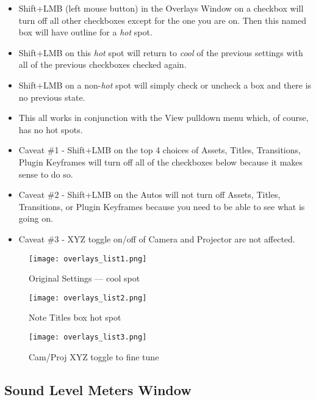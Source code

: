\begin{itemize}
    \item  Shift+LMB (left mouse button) in the Overlays Window on a checkbox will turn off all other
        checkboxes except for the one you are on.  Then this named box will have outline for a  \textit{hot} spot.
    \item  Shift+LMB on this \textit{hot} spot will return to \textit{cool} of the previous settings with all of the previous
        checkboxes checked again.
    \item  Shift+LMB on a non-\textit{hot} spot will simply check or uncheck a box and there is no previous state.
    \item This all works in conjunction with the View pulldown menu which, of course, has no hot spots.
    \item  Caveat \#1 - Shift+LMB on the top 4 choices of Assets, Titles, Transitions, Plugin Keyframes will turn
        off all of the checkboxes below because it makes sense to do so.
    \item  Caveat \#2 - Shift+LMB on the Autos will not turn off Assets, Titles, Transitions, or Plugin Keyframes
        because you need to be able to see what is going on.
        \item Caveat \#3 - XYZ toggle on/off of Camera and Projector are not affected.
\end{itemize}

\begin{figure}[htpb]
    \begin{minipage}{.29\linewidth}
        \centering
        \texttt{[image: overlays\_list1.png]}
        \caption{Original Settings --- cool spot}
        \label{fig:overlays_list1}
    \end{minipage}
    \hfill
    \begin{minipage}{.29\linewidth}
        \centering
        \texttt{[image: overlays\_list2.png]}
        \caption{Note Titles box hot spot  }
        \label{fig:overlays_list2}
    \end{minipage}
    \hfill
    \begin{minipage}{.29\linewidth}
        \centering
        \texttt{[image: overlays\_list3.png]}
        \caption{Cam/Proj XYZ toggle to fine tune}
        \label{fig:overlays_list3}
    \end{minipage}
\end{figure}


\subsection{Sound Level Meters Window}%
\label{sub:sound_level_meters_window}

